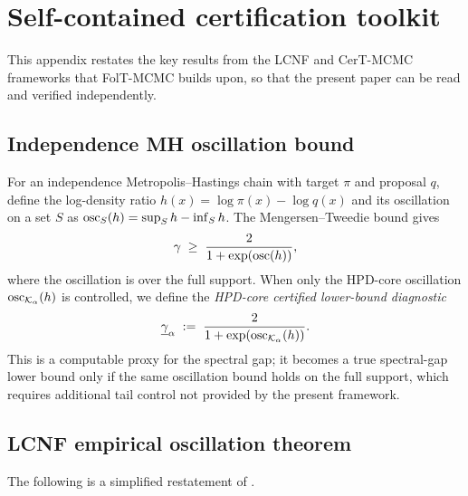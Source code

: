%  

\appendix
\renewcommand{\thesection}{\Alph{section}}

\section{Self-contained certification toolkit}
\label{app:toolkit}

This appendix restates the key results from the LCNF
\citep{LCNF} and CerT-MCMC \citep{CerTMCMC} frameworks
that FolT-MCMC builds upon, so that the present paper can
be read and verified independently.


\subsection{Independence MH oscillation bound}
\label{app:toolkit_imh}

For an independence Metropolis--Hastings chain with target
$\pi$ and proposal $q$, define the log-density ratio
$h(x) = \log\pi(x) - \log q(x)$ and its oscillation on a
set $S$ as $\mathrm{osc}_S(h) = \sup_S h - \inf_S h$.
The Mengersen--Tweedie bound \citep{MengersenTweedie1996}
gives
\[
  \gamma \;\geq\; \frac{2}{1 + \exp(\mathrm{osc}(h))},
\]
where the oscillation is over the full support.  When only
the HPD-core oscillation $\mathrm{osc}_{\mathcal{K}_\alpha}(h)$ is
controlled, we define the \emph{HPD-core certified
lower-bound diagnostic}
\[
  \underline{\gamma}_\alpha
  \;:=\; \frac{2}{1 + \exp(\mathrm{osc}_{\mathcal{K}_\alpha}(h))}.
\]
This is a computable proxy for the spectral gap; it becomes
a true spectral-gap lower bound only if the same oscillation
bound holds on the full support, which requires additional
tail control not provided by the present framework.


\subsection{LCNF empirical oscillation theorem}
\label{app:toolkit_lcnf}

The following is a simplified restatement of
\citet[Theorem~5.1]{LCNF}.

